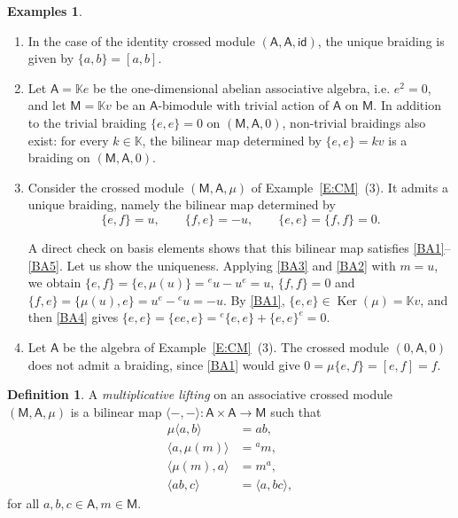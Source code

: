 \documentclass[12pt,reqno]{amsart}
\theoremstyle{plain}
\theoremstyle{definition}
\newtheorem{definition}[theorem]{Definition}
\newtheorem{examples}[theorem]{Examples}
\theoremstyle{remark}
\def\Ker{\operatorname{Ker}}
\newcommand{\K}{\ensuremath{\mathbb{K}}}
\newcommand{\A}{\ensuremath{\mathsf{A}}}
\newcommand{\id}{\ensuremath{\mathsf{id}}}
\newcommand{\MM}{\ensuremath{\mathsf{M}}}
\numberwithin{equation}{section}
\begin{document}
\begin{examples} \label{E:braidings} \hfill
	\begin{enumerate}
	\item In the case of the identity crossed module $(\A,\A,\id)$,
	the unique braiding is given by $\{a,b\} =  [a,b]$.
	
	\item  Let $\A=\K e$ be the one-dimensional abelian associative algebra, i.e. $e^2=0$, and let $\MM=\K v$ be an $\A$-bimodule with trivial action  of $\A$ on $\MM$. 
	In addition to the trivial braiding $\{e,e\}=0$ on $(\MM,\A,0)$, non-trivial braidings also exist: for every $k \in \K$, the bilinear map determined by
	$\{e,e\}=kv$ is a braiding on $(\MM,\A,0)$. 


	\item Consider the crossed module $(\MM,\A,\mu)$ of Example~\ref{E:CM}~(3). It admits a unique braiding, namely the bilinear map determined by
	\[
	\{e,f\}=u, \qquad \{f,e\}=-u, \qquad \{e,e\}=\{f,f\}=0.
	\]

	A direct check on basis elements shows that this bilinear map satisfies \eqref{BA1}--\eqref{BA5}. Let us show the uniqueness. Applying \eqref{BA3} and \eqref{BA2} with $m=u$, we obtain $\{e,f\}=\{e,\mu(u)\}={}^eu-u^e=u$, $\{f,f\}=0$ and $\{f,e\}=\{\mu(u),e\}=u^e-{}^eu=-u$. By \eqref{BA1}, $\{e,e\}\in\Ker(\mu)=\K v$, and then \eqref{BA4} gives $\{e,e\}=\{ee,e\}={}^e\{e,e\}+\{e,e\}^e=0$. 

	\item Let $\A$ be the algebra of Example~\ref{E:CM}~(3). The crossed module $(0,\A,0)$ does not admit a braiding, since \eqref{BA1} would give $0=\mu\{e,f\}=[e,f]=f$.
	\end{enumerate} 
\end{examples} 

\begin{definition}\label{D:ml}
	A \emph{multiplicative lifting} on an associative crossed module $(\MM,\A,\mu)$ is a bilinear map
	$\langle-,-\rangle\colon \A\times \A\to \MM$ such that
	\begin{align}
		\mu \langle a,b\rangle & = ab,\label{ML1} \tag{ML1}\\
		\langle a,\mu (m)\rangle & = {}^a m, \label{ML2} \tag{ML2}\\
		\langle \mu (m),a\rangle & = m^a, \label{ML3} \tag{ML3}\\
		\langle ab,c\rangle & =\langle a,bc\rangle, \label{ML4} \tag{ML4}
	\end{align}
	for all $a,b,c\in\A, m\in\MM$.
\end{definition}
\end{document}
